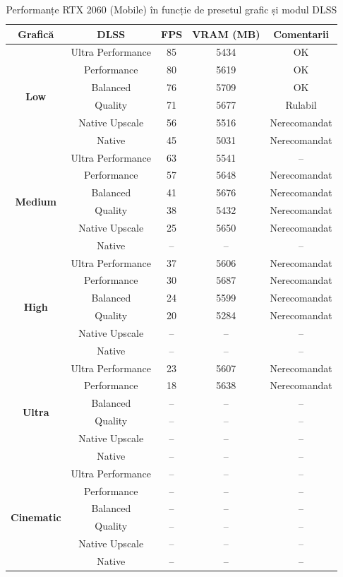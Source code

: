 \begin{table}[htbp]
\centering
\renewcommand{\arraystretch}{1.2}
\begin{tabular}{|c|c|c|c|c|}
\hline
\textbf{Grafică} & \textbf{DLSS} & \textbf{FPS} & \textbf{VRAM (MB)} & \textbf{Comentarii} \\
\hline
\multirow{6}{*}{\textbf{Low}} & Ultra Performance & 85 & 5434 & OK \\
 & Performance       & 80 & 5619 & OK \\
 & Balanced          & 76 & 5709 & OK \\
 & Quality           & 71 & 5677 & Rulabil \\
 & Native Upscale    & 56 & 5516 & Nerecomandat \\
 & Native            & 45 & 5031 & Nerecomandat \\
\hline
\multirow{6}{*}{\textbf{Medium}} & Ultra Performance & 63 & 5541 & -- \\
 & Performance       & 57 & 5648 & Nerecomandat \\
 & Balanced          & 41 & 5676 & Nerecomandat \\
 & Quality           & 38 & 5432 & Nerecomandat \\
 & Native Upscale    & 25 & 5650 & Nerecomandat \\
 & Native            & -- & --   & -- \\
\hline
\multirow{6}{*}{\textbf{High}} & Ultra Performance & 37 & 5606 & Nerecomandat \\
 & Performance       & 30 & 5687 & Nerecomandat \\
 & Balanced          & 24 & 5599 & Nerecomandat \\
 & Quality           & 20 & 5284 & Nerecomandat \\
 & Native Upscale    & -- & --   & -- \\
 & Native            & -- & --   & -- \\
\hline
\multirow{6}{*}{\textbf{Ultra}} & Ultra Performance & 23 & 5607 & Nerecomandat \\
 & Performance       & 18 & 5638 & Nerecomandat \\
 & Balanced          & -- & --   & -- \\
 & Quality           & -- & --   & -- \\
 & Native Upscale    & -- & --   & -- \\
 & Native            & -- & --   & -- \\
\hline
\multirow{6}{*}{\textbf{Cinematic}} & Ultra Performance & -- & -- & -- \\
 & Performance       & -- & -- & -- \\
 & Balanced          & -- & -- & -- \\
 & Quality           & -- & -- & -- \\
 & Native Upscale    & -- & -- & -- \\
 & Native            & -- & -- & -- \\
\hline
\end{tabular}
\caption{Performanțe RTX 2060 (Mobile) în funcție de presetul grafic și modul DLSS}
\label{tab:rtx2060}
\end{table}


